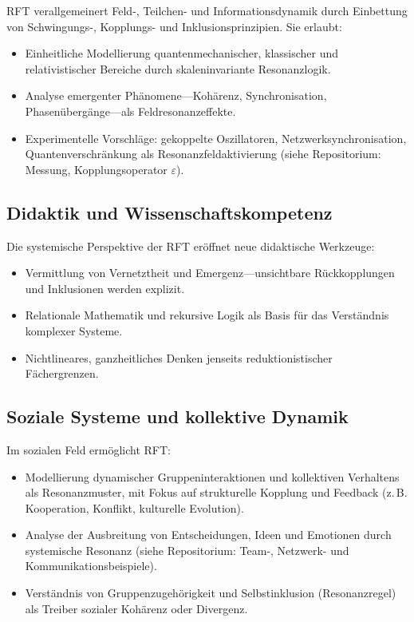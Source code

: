 \documentclass[12pt]{article}
\begin{document}
RFT verallgemeinert Feld-, Teilchen- und Informationsdynamik durch Einbettung von Schwingungs-, Kopplungs- und Inklusionsprinzipien. Sie erlaubt:
\begin{itemize}
	\item Einheitliche Modellierung quantenmechanischer, klassischer und relativistischer Bereiche durch skaleninvariante Resonanzlogik.
	\item Analyse emergenter Phänomene—Kohärenz, Synchronisation, Phasenübergänge—als Feldresonanzeffekte.
	\item Experimentelle Vorschläge: gekoppelte Oszillatoren, Netzwerksynchronisation, Quantenverschränkung als Resonanzfeldaktivierung (siehe Repositorium: Messung, Kopplungsoperator $\varepsilon$).
\end{itemize}

\subsection{Didaktik und Wissenschaftskompetenz}

Die systemische Perspektive der RFT eröffnet neue didaktische Werkzeuge:
\begin{itemize}
	\item Vermittlung von Vernetztheit und Emergenz—unsichtbare Rückkopplungen und Inklusionen werden explizit.
	\item Relationale Mathematik und rekursive Logik als Basis für das Verständnis komplexer Systeme.
	\item Nichtlineares, ganzheitliches Denken jenseits reduktionistischer Fächergrenzen.
\end{itemize}

\subsection{Soziale Systeme und kollektive Dynamik}

Im sozialen Feld ermöglicht RFT:
\begin{itemize}
	\item Modellierung dynamischer Gruppeninteraktionen und kollektiven Verhaltens als Resonanzmuster, mit Fokus auf strukturelle Kopplung und Feedback (z.\,B. Kooperation, Konflikt, kulturelle Evolution).
	\item Analyse der Ausbreitung von Entscheidungen, Ideen und Emotionen durch systemische Resonanz (siehe Repositorium: Team-, Netzwerk- und Kommunikationsbeispiele).
	\item Verständnis von Gruppenzugehörigkeit und Selbstinklusion (Resonanzregel) als Treiber sozialer Kohärenz oder Divergenz.
\end{itemize}
\end{document}
